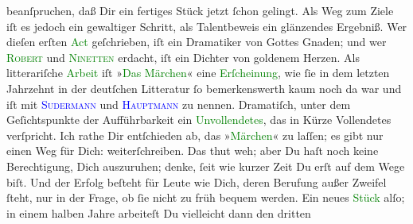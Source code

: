 \documentclass[twoside=false,titlepage=false,open=any, parskip=never, fontsize=12pt, headings=small, chapterprefix=false, appendixprefix=false]{scrbook}
\newcommand{\pbposition}{\depth}
\newcommand{\pb}{\nobreak\hspace{0pt}\raisebox{-0.1em}{\raisebox{\pbposition}{\textnormal{|}}}\nobreak\hspace{0pt}}
\begin{document}
               beanſpruchen, daß Dir ein fertiges Stück jetzt ſchon gelingt. Als Weg zum Ziele iſt
               es jedoch ein gewaltiger Schritt, als Talentbeweis ein glänzendes Ergebniß. Wer
               dieſen erſten \textcolor{green}{Act}{} geſchrieben,
               iſt ein Dramatiker von Gottes Gnaden; und wer \textsc{\textcolor{green}{Robert}{}} und \textsc{\textcolor{green}{Ninetten}{}} erdacht, iſt ein Dichter von goldenem Herzen. Als litterariſche \textcolor{green}{Arbeit}{} iſt »\textcolor{green}{Das Märchen}{}\ledrightnote{\textcolor{green}{Das Märchen. Schauspiel in drei Aufzügen}}« eine \textcolor{green}{Erſcheinung}{}, wie ſie in dem letzten Jahrzehnt in der deutſchen Litteratur ſo
               bemerkenswerth kaum noch da war und iſt mit \textsc{\textcolor{blue}{Sudermann}{}\ledrightnote{\textcolor{blue}{Hermann Sudermann}}} und \textsc{\textcolor{blue}{Hauptmann}{}\ledrightnote{\textcolor{blue}{Gerhart Hauptmann}}} zu nennen. Dramatiſch, unter dem {\pb}Geſichtspunkte der Aufführbarkeit ein \textcolor{green}{Unvollendetes}{}, das in Kürze Vollendetes verſpricht. Ich rathe
               Dir entſchieden ab, das »\textcolor{green}{Märchen}{}\ledrightnote{\textcolor{green}{Das Märchen. Schauspiel in drei Aufzügen}}« \label{K_L02674-3v}\label{K_L02674-3h} zu laſſen; es gibt nur einen Weg für Dich:
               weiterſchreiben. Das thut weh; aber Du haſt noch keine Berechtigung, Dich auszuruhen;
               denke, ſeit wie kurzer Zeit Du erſt auf dem Wege biſt. Und der Erfolg beſteht für
               Leute wie Dich, deren Berufung außer Zweifel ſteht, nur in der Frage, ob ſie nicht zu
               früh bequem werden. Ein neues \textcolor{green}{Stück}{} alſo; in einem halben Jahre arbeiteſt Du vielleicht dann den dritten
\end{document}
